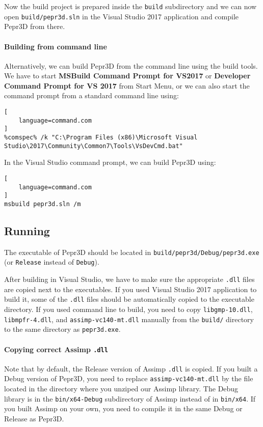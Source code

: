 Now the build project is prepared inside the \texttt{build} subdirectory and we can now open \texttt{build/pepr3d.sln} in the Visual Studio 2017 application and compile Pepr3D from there.

\paragraph{Building from command line}
Alternatively, we can build Pepr3D from the command line using the build tools. We have to start \textbf{MSBuild Command Prompt for VS2017} or \textbf{Developer Command Prompt for VS 2017} from Start Menu, or we can also start the command prompt from a standard command line using:

\begin{lstlisting}[
    language=command.com
]
%comspec% /k "C:\Program Files (x86)\Microsoft Visual Studio\2017\Community\Common7\Tools\VsDevCmd.bat"
\end{lstlisting}

In the Visual Studio command prompt, we can build Pepr3D using:

\begin{lstlisting}[
    language=command.com
]
msbuild pepr3d.sln /m
\end{lstlisting}

\subsection{Running}

The executable of Pepr3D should be located in \texttt{build/pepr3d/Debug/pepr3d.exe} (or \texttt{Release} instead of \texttt{Debug}).

After building in Visual Studio, we have to make sure the appropriate \texttt{.dll} files are copied next to the executables.
If you used Visual Studio 2017 application to build it, some of the \texttt{.dll} files should be automatically copied to the executable directory.
If you used command line to build, you need to copy \texttt{libgmp-10.dll}, \texttt{libmpfr-4.dll}, and \texttt{assimp-vc140-mt.dll} manually from the \texttt{build/} directory to the same directory as \texttt{pepr3d.exe}.

\paragraph{Copying correct Assimp \texttt{.dll}}
Note that by default, the Release version of Assimp \texttt{.dll} is copied.
If you built a Debug version of Pepr3D, you need to replace \texttt{assimp-vc140-mt.dll} by the file located in the directory where you unziped our Assimp library.
The Debug library is in the \texttt{bin/x64-Debug} subdirectory of Assimp instead of in \texttt{bin/x64}.
If you built Assimp on your own, you need to compile it in the same Debug or Release as Pepr3D.

